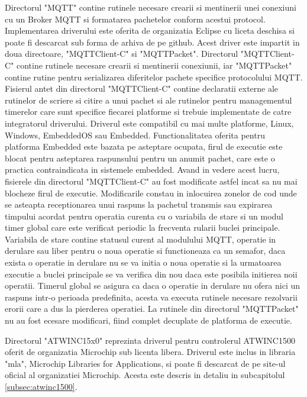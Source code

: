 Directorul "MQTT" contine rutinele necesare crearii si mentinerii unei conexiuni cu un Broker MQTT si formatarea pachetelor conform acestui protocol. Implementarea 
driverului este oferita de organizatia Eclipse cu liceta deschisa si poate fi descarcat sub forma de arhiva de pe github. Acest driver este impartit in doua directoare, 
"MQTTClient-C" si "MQTTPacket". Directorul "MQTTClient-C" contine rutinele necesare crearii si mentinerii conexiunii, iar "MQTTPacket" contine rutine pentru serializarea 
diferitelor pachete specifice protocolului MQTT. Fisierul antet din directorul "MQTTClient-C" contine declaratii externe ale rutinelor de scriere si citire a unui pachet si 
ale rutinelor pentru managementul timerelor care sunt specifice fiecarei platforme si trebuie implementate de catre integratorul driverului. Driverul este compatibil cu 
mai multe platforme, Linux, Windows, EmbeddedOS sau Embedded. Functionalitatea oferita pentru platforma Embedded este bazata pe asteptare ocupata, firul de executie 
este blocat pentru asteptarea raspunsului pentru un anumit pachet, care este o practica contraindicata in sistemele embedded. Avand in vedere acest lucru, fisierele 
din directorul "MQTTClient-C" au fost modificate astfel incat sa nu mai blocheze firul de executie. Modificarile constau in inlocuirea zonelor de cod unde se asteapta 
receptionarea unui raspuns la pachetul transmis sau expirarea timpului acordat pentru operatia curenta cu o variabila de stare si un modul timer global care este 
verificat periodic la frecventa rularii buclei principale. Variabila de stare contine statusul curent al modulului MQTT, operatie in derulare sau liber pentru 
o noua operatie si functioneaza ca un semafor, daca exista o operatie in derulare nu se va initia o noua operatie si la urmatoarea executie a buclei principale se va 
verifica din nou daca este posibila initierea noii operatii. Timerul global se asigura ca daca o operatie in derulare nu ofera nici un raspuns intr-o perioada 
predefinita, acesta va executa rutinele necesare rezolvarii erorii care a dus la pierderea operatiei. La rutinele din directorul "MQTTPacket" nu au fost ecesare 
modificari, fiind complet decuplate de platforma de executie. 

Directorul "ATWINC15x0" reprezinta driverul pentru controlerul ATWINC1500 oferit de organizatia Microchip sub licenta libera. Driverul este inclus in libraria 
"mla", Microchip Libraries for Applications, si poate fi descarcat de pe site-ul oficial al organizatiei Microchip. Acesta este descris in detaliu in subcapitolul
\ref{subsec:atwinc1500}.

